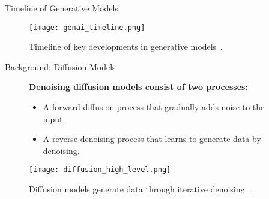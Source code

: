  \begin{refsection}
  \begin{frame}{Timeline of Generative Models}
    \begin{figure}
      \centering
      \texttt{[image: genai\_timeline.png]}
      \caption{\scriptsize Timeline of key developments in generative models~\parencite{dengPPTAdvancedNueralNetwork2024}.}
    \end{figure}
    \bottomleftrefs
  \end{frame}
  \end{refsection}
  
  
  
  \begin{refsection}
  \begin{frame}{Background: Diffusion Models}
  
    \begin{figure}
      \begin{minipage}{0.95\linewidth}
        \footnotesize
        \textbf{Denoising diffusion models consist of two processes:}
        \begin{itemize}
          \item A forward diffusion process that gradually adds noise to the input.
          \item A reverse denoising process that learns to generate data by denoising.
        \end{itemize}
      \end{minipage}
      \vspace{2em}
  
      \centering
      \texttt{[image: diffusion\_high\_level.png]}
  
      \caption[]{\scriptsize Diffusion models generate data through iterative denoising~\parencite{sohl2015deep,ho2020denoising}.}
    \end{figure}
  
    \bottomleftrefs
  \end{frame}
  \end{refsection}
  
